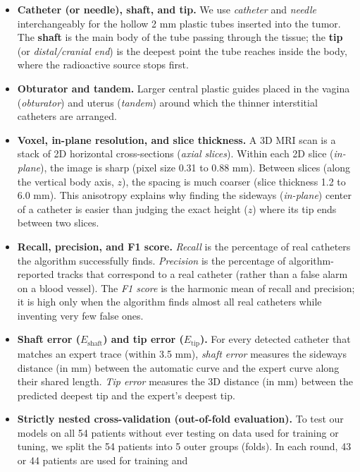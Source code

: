 \documentclass[
  11pt,
]{article}
\providecommand{\tightlist}{%
  \setlength{\itemsep}{0pt}\setlength{\parskip}{0pt}}
\begin{document}
\begin{itemize}
\tightlist
\item
  \textbf{Catheter (or needle), shaft, and tip.} We use \emph{catheter}
  and \emph{needle} interchangeably for the hollow 2 mm plastic tubes
  inserted into the tumor. The \textbf{shaft} is the main body of the
  tube passing through the tissue; the \textbf{tip} (or
  \emph{distal/cranial end}) is the deepest point the tube reaches
  inside the body, where the radioactive source stops first.
\item
  \textbf{Obturator and tandem.} Larger central plastic guides placed in
  the vagina (\emph{obturator}) and uterus (\emph{tandem}) around which
  the thinner interstitial catheters are arranged.
\item
  \textbf{Voxel, in-plane resolution, and slice thickness.} A 3D MRI
  scan is a stack of 2D horizontal cross-sections (\emph{axial slices}).
  Within each 2D slice (\emph{in-plane}), the image is sharp (pixel size
  0.31 to 0.88 mm). Between slices (along the vertical body axis,
  \(z\)), the spacing is much coarser (slice thickness 1.2 to 6.0 mm).
  This anisotropy explains why finding the sideways (\emph{in-plane})
  center of a catheter is easier than judging the exact height (\(z\))
  where its tip ends between two slices.
\item
  \textbf{Recall, precision, and F1 score.} \emph{Recall} is the
  percentage of real catheters the algorithm successfully finds.
  \emph{Precision} is the percentage of algorithm-reported tracks that
  correspond to a real catheter (rather than a false alarm on a blood
  vessel). The \emph{F1 score} is the harmonic mean of recall and
  precision; it is high only when the algorithm finds almost all real
  catheters while inventing very few false ones.
\item
  \textbf{Shaft error (\(E_{\text{shaft}}\)) and tip error
  (\(E_{\text{tip}}\)).} For every detected catheter that matches an
  expert trace (within 3.5 mm), \emph{shaft error} measures the sideways
  distance (in mm) between the automatic curve and the expert curve
  along their shared length. \emph{Tip error} measures the 3D distance
  (in mm) between the predicted deepest tip and the expert's deepest
  tip.
\item
  \textbf{Strictly nested cross-validation (out-of-fold evaluation).} To
  test our models on all 54 patients without ever testing on data used
  for training or tuning, we split the 54 patients into 5 outer groups
  (folds). In each round, 43 or 44 patients are used for training and

\end{itemize}
\end{document}
